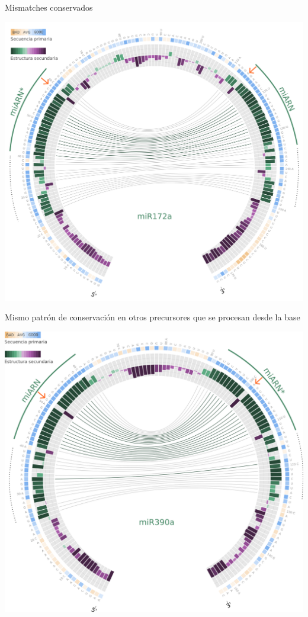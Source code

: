 \documentclass{beamer}
\begin{document}
\begin{frame}{Mismatches conservados}
	\begin{center}
		\includegraphics[width=.8\textwidth]{img/miR172a_circos06.png}
	\end{center}
\end{frame}

\begin{frame}{Mismo patrón de conservación en otros precursores que se procesan desde la base}
	\begin{center}
		\includegraphics[width=.8\textwidth]{img/miR390a_circos.png}
	\end{center}
\end{frame}
\end{document}
